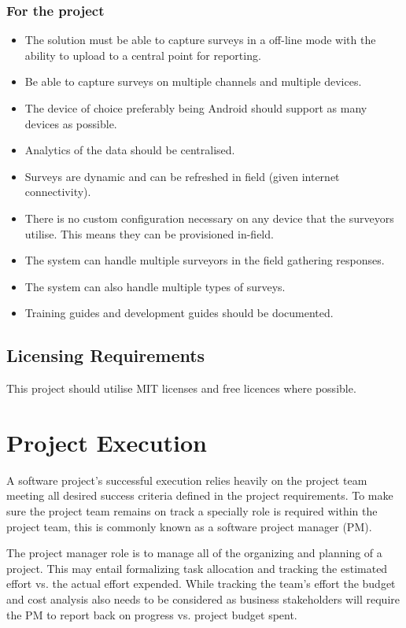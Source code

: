 \documentclass[12pt]{witseiepaper}
\begin{document}
\subsubsection{For the project}
\begin{itemize}
  \item The solution must be able to capture surveys in a off-line mode with the ability to upload to a central point for reporting.
  \item Be able to capture surveys on multiple channels and multiple devices.
  \item The device of choice preferably being Android should support as many devices as possible.
  \item Analytics of the data should be centralised.
  \item Surveys are dynamic and can be refreshed in field (given internet connectivity).
  \item There is no custom configuration necessary on any device that the surveyors utilise. This means they can be provisioned in-field.
  \item The system can handle multiple surveyors in the field gathering responses.
  \item The system can also handle multiple types of surveys.
  \item Training guides and development guides should be documented.
\end{itemize}

\subsection{Licensing Requirements}
This project should utilise MIT licenses and free licences where possible.

\section{Project Execution}
A software project's successful execution relies heavily on the project team meeting all desired success criteria defined in the project requirements. To make sure the project team remains on track a specially role is required within the project team, this is commonly known as a software project manager (PM). \cite{SPM}

The project manager role is to manage all of the organizing and planning of a project. This may entail formalizing task allocation and tracking the estimated effort vs. the actual effort expended.
While tracking the team’s effort the budget and cost analysis also needs to be considered as business stakeholders will require the PM to report back on progress vs. project budget spent. \cite{ExpertJudgement}
\end{document}
